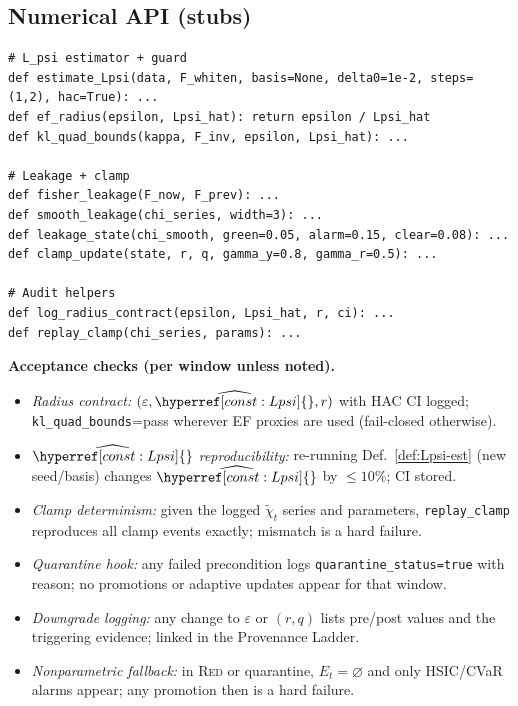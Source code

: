 \documentclass[10pt]{article}
\newcommand{\cutq}{q}
\newcommand{\constref}[1]{\hyperref[const:#1]{\ensuremath{\csname constsym#1\endcsname}}}
\begin{document}
\subsection*{Numerical API (stubs)}
\begin{lstlisting}
# L_psi estimator + guard
def estimate_Lpsi(data, F_whiten, basis=None, delta0=1e-2, steps=(1,2), hac=True): ...
def ef_radius(epsilon, Lpsi_hat): return epsilon / Lpsi_hat
def kl_quad_bounds(kappa, F_inv, epsilon, Lpsi_hat): ...

# Leakage + clamp
def fisher_leakage(F_now, F_prev): ...
def smooth_leakage(chi_series, width=3): ...
def leakage_state(chi_smooth, green=0.05, alarm=0.15, clear=0.08): ...
def clamp_update(state, r, q, gamma_y=0.8, gamma_r=0.5): ...

# Audit helpers
def log_radius_contract(epsilon, Lpsi_hat, r, ci): ...
def replay_clamp(chi_series, params): ...
\end{lstlisting}

\begin{mdframed}
\textbf{Acceptance checks (per window unless noted).}
\begin{itemize}[leftmargin=*]
\item \emph{Radius contract:} $(\varepsilon,\widehat{\constref{Lpsi}},r)$ with HAC CI logged; \texttt{kl\_quad\_bounds}=\textsf{pass} wherever EF proxies are used (fail-closed otherwise).
\item \emph{$\widehat{\constref{Lpsi}}$ reproducibility:} re-running Def.~\ref{def:Lpsi-est} (new seed/basis) changes $\widehat{\constref{Lpsi}}$ by $\le 10\%$; CI stored.
\item \emph{Clamp determinism:} given the logged $\tilde\chi_t$ series and parameters, \texttt{replay\_clamp} reproduces all clamp events exactly; mismatch is a hard failure.
\item \emph{Quarantine hook:} any failed precondition logs \texttt{quarantine\_status=true} with reason; no promotions or adaptive updates appear for that window.
\item \emph{Downgrade logging:} any change to $\varepsilon$ or $(r,\cutq)$ lists pre/post values and the triggering evidence; linked in the Provenance Ladder.
\item \emph{Nonparametric fallback:} in \textsc{Red} or quarantine, $E_t=\varnothing$ and only HSIC/CVaR alarms appear; any promotion then is a hard failure.
\end{itemize}
\end{mdframed}
\end{document}
